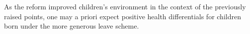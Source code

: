 \documentclass[11pt, a4paper]{article} %
\begin{document}
As the reform improved children's environment in the context of the previously raised points, one may a priori expect positive health differentials for children born under the more generous leave scheme.
















\end{document}
